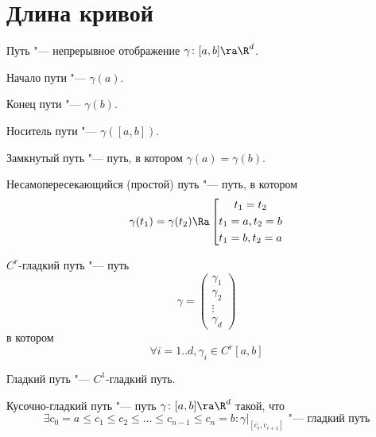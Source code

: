 \section {Длина кривой}

\begin{Def}
	Путь "--- непрерывное отображение $\gamma \colon [a,b] \ra \R^d$.
\end{Def}

\begin{Def}
	Начало пути "--- $\gamma(a)$.
\end{Def}

\begin{Def}
	Конец пути "--- $\gamma(b)$.
\end{Def}

\begin{Def}
	Носитель пути "--- $\gamma([a,b])$.
\end{Def}

\begin{Def}
	Замкнутый путь "--- путь, в котором $\gamma(a) = \gamma(b)$.
\end{Def}

\begin{Def}
	Несамопересекающийся (простой) путь "--- путь, в котором
	\[
		\gamma(t_1) = \gamma(t_2) \Ra
		\left[
			\begin{gathered}
				t_1 = t_2 \\
				t_1 = a, t_2 = b \\
				t_1 = b, t_2 = a \\
			\end{gathered}
		\right.
	\]
\end{Def}

\begin{Def}
	$C^r$-гладкий путь "--- путь
	\[
		\gamma =
		\begin{pmatrix}
			\gamma_1 \\
			\gamma_2 \\
			\vdots \\
			\gamma_d
		\end{pmatrix}
	\]
	в котором
	\[ \forall i=1..d, \gamma_i \in C^r[a, b] \]
\end{Def}

\begin{Def}
	Гладкий путь "--- $C^1$-гладкий путь.
\end{Def}

\begin{Def}
	Кусочно-гладкий путь "--- путь $\gamma \colon [a, b] \ra \R^d$ такой, что
	\[ \exists c_0=a \le c_1 \le c_2 \le \dots \le c_{n-1} \le c_n = b \colon \gamma\bigr|_{[c_i, c_{i+1}]} \text{ "--- гладкий путь} \]
\end{Def}

